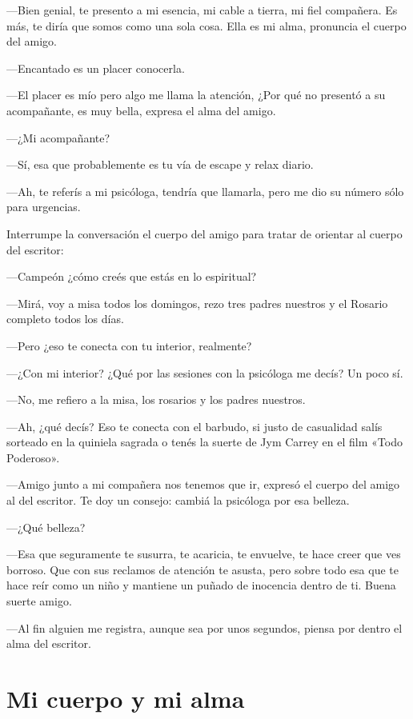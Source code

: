 \documentclass[11pt,twoside,openright,a5paper]{book}
\begin{document}
---Bien genial, te presento a mi esencia, mi cable a tierra, mi fiel compañera. Es más, te diría que somos como una sola cosa. Ella es mi alma, pronuncia el cuerpo del amigo.

---Encantado es un placer conocerla.

---El placer es mío pero algo me llama la atención, ¿Por qué no presentó a su acompañante, es muy bella, expresa el alma del amigo.

---¿Mi acompañante?

---Sí, esa que probablemente es tu vía de escape y relax diario.

---Ah, te referís a mi psicóloga, tendría que llamarla, pero me dio su número sólo para urgencias.

Interrumpe la conversación el cuerpo del amigo para tratar de orientar al cuerpo del escritor: 

---Campeón ¿cómo creés que estás en lo espiritual?

---Mirá, voy a misa todos los domingos, rezo tres padres nuestros y el Rosario completo todos los días.

---Pero ¿eso te conecta con tu interior, realmente?

---¿Con mi interior?  ¿Qué por las sesiones con la psicóloga me decís?  Un poco sí.

---No, me refiero a la misa, los rosarios y los padres nuestros.

---Ah, ¿qué decís? Eso te conecta con el barbudo, si justo de casualidad salís sorteado en la quiniela sagrada o tenés la suerte de Jym Carrey en el film «Todo Poderoso».

---Amigo junto a mi compañera nos tenemos que ir, expresó el cuerpo del amigo al del escritor. Te doy un consejo: cambiá la psicóloga por esa belleza.

---¿Qué belleza?

---Esa que seguramente te susurra, te acaricia, te envuelve, te hace creer que ves borroso. Que con sus reclamos de atención te asusta, pero sobre todo esa que te hace reír como un niño y mantiene un puñado de inocencia dentro de ti. Buena suerte amigo.

---Al fin alguien me registra, aunque sea por unos segundos, piensa por dentro el alma del escritor.


\section*{Mi cuerpo y mi alma}
\end{document}

